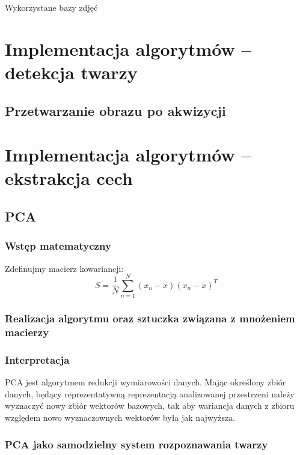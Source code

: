 \documentclass{article}
\begin{document}
Wykorzystane bazy zdjęć



\section{Implementacja algorytmów – detekcja twarzy}
 
\subsection{Przetwarzanie obrazu po akwizycji} 
 
 
 
 
\section{Implementacja algorytmów – ekstrakcja cech}
 
\subsection{PCA}
\subsubsection{Wstęp matematyczny}

Zdefinujmy macierz kowariancji:
\begin{equation}
	S = \frac{1}{N} \sum_{n=1}^{N} (x_n - \overline{x})(x_n - \overline{x})^T
\end{equation}


\subsubsection{Realizacja algorytmu oraz sztuczka związana z mnożeniem macierzy} 


\subsubsection{Interpretacja}
PCA jest algorytmem redukcji wymiarowości danych. Mając określony zbiór danych, będący reprezentatywną reprezentacją analizowanej przestrzeni należy wyznaczyć nowy zbiór wektorów bazowych, tak aby wariancja danych z zbioru względem nowo wyznaczownych wektorów była jak najwyższa.

\subsubsection{PCA jako samodzielny system rozpoznawania twarzy}
 
\end{document}
